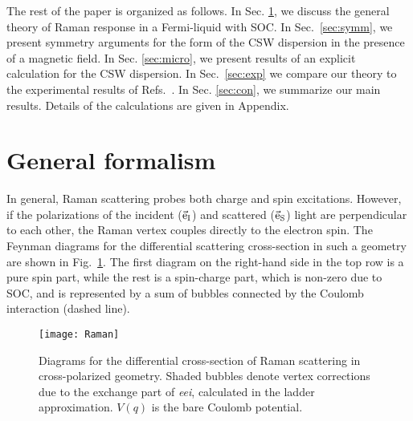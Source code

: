 \documentclass[prb,aps,twocolumn]{revtex4}
\begin{document}
The rest of the paper is organized as follows. In Sec.
\ref{sec:raman}, we discuss the general theory of Raman response
in a Fermi-liquid with SOC. In Sec.~\ref{sec:symm}, we present
symmetry arguments for the form of the CSW dispersion in the
presence of a magnetic field. In Sec. \ref{sec:micro}, we present
results of an explicit calculation for the CSW dispersion. In
Sec.~\ref{sec:exp} we compare our theory to the experimental
results of Refs.~. In Sec.
\ref{sec:con}, we summarize our main results. Details of the
calculations are given in Appendix.

\section{General formalism} \label{sec:raman} In general, Raman scattering
probes both charge and spin excitations. However, if the
polarizations of the incident ($\vec{\rm e}_{\rm I}$) and
scattered ($\vec{\rm e}_{\rm S}$) light are perpendicular to each
other, the Raman vertex couples directly to the electron
spin.\cite{raman_book,Magarill} The Feynman diagrams for the
differential scattering cross-section in such a geometry are shown
in Fig.~\ref{fig:two}. The first diagram on the right-hand side in the top row
 is a pure spin part, while the
rest is a spin-charge part, which is non-zero due to SOC, and
is represented by a sum of bubbles connected by the Coulomb
interaction (dashed line).

\begin{figure}[htp]
\texttt{[image: Raman]}
\caption{ \label{fig:two} Diagrams for the differential
cross-section of Raman scattering in cross-polarized geometry.
Shaded bubbles denote vertex corrections due to the exchange part
of {\em eei}, calculated in the ladder approximation. $V(q)$ is
the bare Coulomb potential.}
\end{figure}
\end{document}
